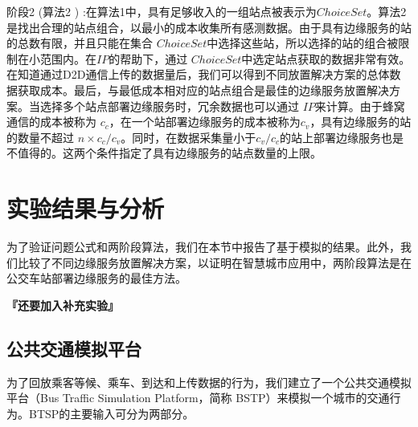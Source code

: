 
阶段2 (算法2 ) :在算法1中，具有足够收入的一组站点被表示为$ChoiceSet$。算法2是找出合理的站点组合，以最小的成本收集所有感测数据。由于具有边缘服务的站的总数有限，并且只能在集合 $ChoiceSet$中选择这些站，所以选择的站的组合被限制在小范围内。在$IP$的帮助下，通过 $ChoiceSet$中选定站点获取的数据非常有效。在知道通过D2D通信上传的数据量后，我们可以得到不同放置解决方案的总体数据获取成本。最后，与最低成本相对应的站点组合是最佳的边缘服务放置解决方案。当选择多个站点部署边缘服务时，冗余数据也可以通过 $IP$来计算。由于蜂窝通信的成本被称为 $c_c$，在一个站部署边缘服务的成本被称为$c_v$，具有边缘服务的站的数量不超过 $n\times c_c / c_v$。同时，在数据采集量小于$c_v/c_c$的站上部署边缘服务也是不值得的。这两个条件指定了具有边缘服务的站点数量的上限。

\section{实验结果与分析}

为了验证问题公式和两阶段算法，我们在本节中报告了基于模拟的结果。此外，我们比较了不同边缘服务放置解决方案，以证明在智慧城市应用中，两阶段算法是在公交车站部署边缘服务的最佳方法。

\textbf{『还要加入补充实验』}

\subsection{公共交通模拟平台}


为了回放乘客等候、乘车、到达和上传数据的行为，我们建立了一个公共交通模拟平台（Bus Traffic Simulation Platform，简称 BSTP）来模拟一个城市的交通行为。BTSP的主要输入可分为两部分。

